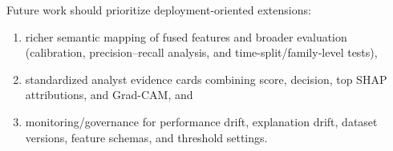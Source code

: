 \documentclass[conference]{IEEEtran}
\begin{document}


Future work should prioritize deployment-oriented extensions: 
 \begin{enumerate}
  \item[(i)]
  richer semantic mapping of fused features and broader evaluation (calibration, precision--recall analysis, and time-split/family-level tests), 
  \item[(ii)]
  standardized analyst evidence cards combining score, decision, top SHAP attributions, and Grad-CAM, and
  \item[(iii)]
   monitoring/governance for performance drift, explanation drift, dataset versions, feature schemas, and threshold settings.
\end{enumerate}






\end{document}
